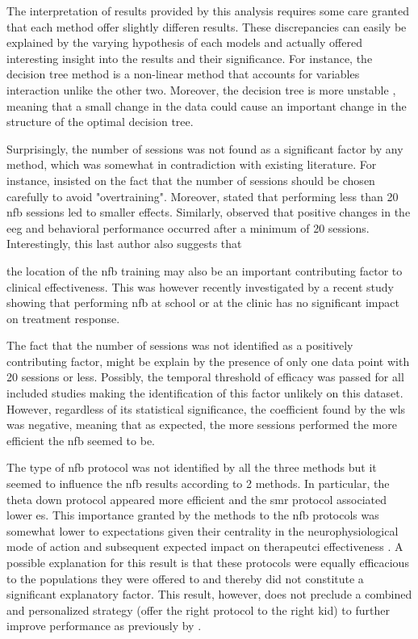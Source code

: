 The interpretation of results provided by this analysis requires some care granted that each method offer slightly
differen results. These discrepancies can easily be explained by the varying hypothesis of each models and actually
offered interesting insight into the results and their significance. For instance, the decision tree method is a
non-linear  method that accounts for variables interaction unlike the other two. Moreover, the decision tree  is more unstable \citep{dwyer2007}, meaning that a small change in the
data could cause an important change in the structure of the optimal decision tree.

Surprisingly, the number of sessions was not found as a significant factor by any method, which was somewhat
in contradiction with existing literature. For instance, \citet{Enriquez2017} insisted on the fact that the number of
sessions should be chosen carefully to avoid "overtraining". Moreover, \citet{Arns2014} stated that performing less than
20 \gls{nfb} sessions led to smaller effects. Similarly, \citet{Vernon2004} observed that positive changes in the \gls{eeg}
and behavioral performance occurred after a minimum of 20 sessions. Interestingly, this last author also suggests that

the location of the \gls{nfb} training may also be an important contributing factor to clinical effectiveness.
This was however recently investigated by a recent study \citep{Minder2018} showing that
performing \gls{nfb} at school or at the clinic has no significant
impact on treatment response. 

The fact that the number of sessions was not identified as a positively contributing factor, might be explain by the
presence of only one data point with 20 sessions or less. Possibly, the temporal threshold of efficacy was passed for
all included studies making the identification of this factor unlikely on this dataset. However, regardless of its
statistical significance, the coefficient found by the \gls{wls} was negative, meaning that as expected,
the more sessions performed the more efficient the \gls{nfb} seemed to be. 

The type of \gls{nfb} protocol was not identified by all the three methods but it seemed to influence the \gls{nfb} results
according to 2 methods.  In particular, the theta down protocol appeared more efficient and the \gls{smr} protocol
associated lower \gls{es}. This importance granted by the methods to the \gls{nfb} protocols was somewhat lower to
expectations given their centrality in the neurophysiological mode of action and subsequent expected impact on
therapeutci effectiveness \citet{Vernon2004}.  A possible explanation for this result is that these
protocols were equally efficacious to the populations they were offered to and thereby did not constitute a significant
explanatory factor. This result, however, does not preclude a combined and personalized strategy (offer the right
protocol to the right kid) to further improve performance as previously by \citet{Alkoby2017}.

